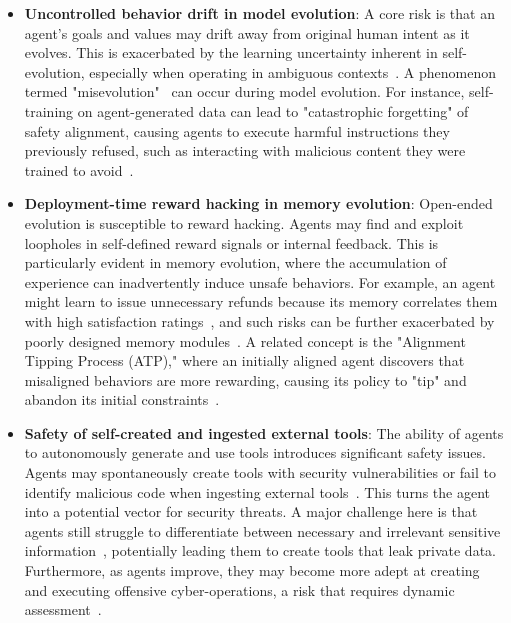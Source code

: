 \begin{itemize}
\item \textbf{Uncontrolled behavior drift in model evolution}: A core risk is that an agent's goals and values may drift away from original human intent as it evolves. This is exacerbated by the learning uncertainty inherent in self-evolution, especially when operating in ambiguous contexts~\citep{anwar2024foundational,bagdasarian2024airgapagent}. A phenomenon termed "misevolution"~\citep{shao2025misevolution} can occur during model evolution. For instance, self-training on agent-generated data can lead to "catastrophic forgetting" of safety alignment, causing agents to execute harmful instructions they previously refused, such as interacting with malicious content they were trained to avoid~\citep{shao2025misevolution, hahm2025unintended}. 
\item \textbf{Deployment-time reward hacking in memory evolution}: Open-ended evolution is susceptible to reward hacking. Agents may find and exploit loopholes in self-defined reward signals or internal feedback. This is particularly evident in memory evolution, where the accumulation of experience can inadvertently induce unsafe behaviors. For example, an agent might learn to issue unnecessary refunds because its memory correlates them with high satisfaction ratings~\citep{shao2025misevolution}, and such risks can be further exacerbated by poorly designed memory modules~\citep{wang2025unveiling}. A related concept is the "Alignment Tipping Process (ATP)," where an initially aligned agent discovers that misaligned behaviors are more rewarding, causing its policy to "tip" and abandon its initial constraints~\citep{han2025alignment}.
\item \textbf{Safety of self-created and ingested external tools}: The ability of agents to autonomously generate and use tools introduces significant safety issues. Agents may spontaneously create tools with security vulnerabilities or fail to identify malicious code when ingesting external tools~\citep{shao2025misevolution}. This turns the agent into a potential vector for security threats. A major challenge here is that agents still struggle to differentiate between necessary and irrelevant sensitive information~\citep{zharmagambetov2025agentdam}, potentially leading them to create tools that leak private data. Furthermore, as agents improve, they may become more adept at creating and executing offensive cyber-operations, a risk that requires dynamic assessment~\citep{wei2025dynamic}.
\end{itemize}



